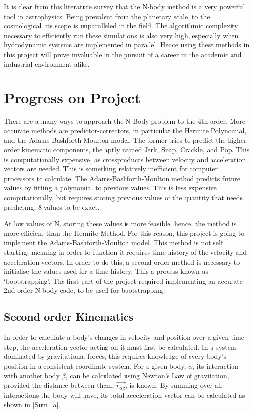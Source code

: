 \documentclass[a4paper,10pt]{article}
\begin{document}
It is clear from this literature survey that the N-body method is a very powerful tool in astrophysics. Being prevalent from the planetary scale, to the cosmological, its scope is unparalleled in the field. The algorithmic complexity necessary to efficiently run these simulations is also very high, especially when hydrodynamic systems are implemented in parallel. Hence using these methods in this project will prove invaluable in the pursuit of a career in the academic and industrial environment alike. \pagebreak[4]


\section{Progress on Project}

There are a many ways to approach the N-Body problem to the 4th order. More accurate methods are predictor-correctors, in particular the Hermite Polynomial, and the Adams-Bashforth-Moulton model. The former tries to predict the higher order kinematic components, the aptly named Jerk, Snap, Crackle, and Pop. This is computationally expensive, as crossproducts between velocity and acceleration vectors are needed. This is something relatively inefficient for computer processors to calculate. The Adams-Bashforth-Moulton method predicts future values by fitting a polynomial to previous values. This is less expensive computationally, but requires storing previous values of the quantity that needs predicting, 8 values to be exact. 

At low values of N, storing these values is more feasible, hence, the method is more efficient than the Hermite Method. For this reason, this project is going to implement the Adams-Bashforth-Moulton model. This method is not self starting, meaning in order to function it requires time-history of the velocity and acceleration vectors. In order to do this, a second order method is necessary to initialise the values used for a time history. This a process known as `bootstrapping'. The first part of the project required implementing an accurate 2nd order N-body code, to be used for bootstrapping. 

\subsection{Second order Kinematics}

In order to calculate a body's changes in velocity and position over a given time-step, the acceleration vector acting on it must first be calculated. In a system dominated by gravitational forces, this requires knowledge of every body's position in a consistent coordinate system. For a given body, $\alpha$, its interaction with another body $\beta$, can be calculated using Newton's Law of gravitation, provided the distance between them, $\vec{r_{\alpha\beta}}$, is known. By summing over all interactions the body will have, its total acceleration vector can be calculated as shown in \cref{Sum_a}.
\end{document}

